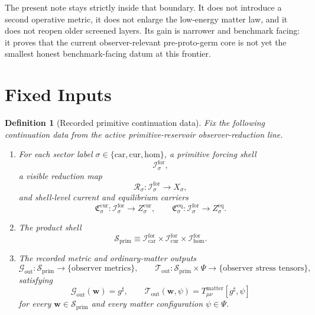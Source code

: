 \documentclass[11pt]{article}
\newcommand{\CompletedMetric}{g^{\sharp}}
\newcommand{\MatterSpace}{\Psi}
\newcommand{\Car}{\mathrm{car}}
\newcommand{\Cur}{\mathrm{cur}}
\newcommand{\Hom}{\mathrm{hom}}
\newcommand{\ForSpace}[1]{\mathcal I_{#1}^{\mathrm{for}}}
\newcommand{\PrimShell}{\mathcal S_{\mathrm{prim}}}
\newcommand{\Reduction}[1]{\mathcal R_{#1}}
\newcommand{\CurrentCarrier}[1]{\mathfrak C_{#1}^{\mathrm{cur}}}
\newcommand{\EqCarrier}[1]{\mathfrak C_{#1}^{\mathrm{eq}}}
\newcommand{\MetricOut}{\mathscr G_{\mathrm{out}}}
\newcommand{\MatterOut}{\mathscr T_{\mathrm{out}}}
\newtheorem{definition}{Definition}
\begin{document}
The present note stays strictly inside that boundary. It does not introduce a second operative metric, it does not enlarge the low-energy matter law, and it does not reopen older screened layers. Its gain is narrower and benchmark facing: it proves that the current observer-relevant pre-proto-germ core is not yet the smallest honest benchmark-facing datum at this frontier.

\section{Fixed Inputs}

\begin{definition}[Recorded primitive continuation data]
\label{def:fixed}
Fix the following continuation data from the active primitive-reservoir observer-reduction line.
\begin{enumerate}
    \item For each sector label \(\sigma\in\{\Car,\Cur,\Hom\}\), a primitive forcing shell
    \[
    \ForSpace{\sigma},
    \]
    a visible reduction map
    \[
    \Reduction{\sigma}:\ForSpace{\sigma}\to X_{\sigma},
    \]
    and shell-level current and equilibrium carriers
    \[
    \CurrentCarrier{\sigma}:\ForSpace{\sigma}\to Z_{\sigma}^{\mathrm{cur}},
    \qquad
    \EqCarrier{\sigma}:\ForSpace{\sigma}\to Z_{\sigma}^{\mathrm{eq}}.
    \]
    \item The product shell
    \[
    \PrimShell
    \equiv
    \ForSpace{\Car}\times \ForSpace{\Cur}\times \ForSpace{\Hom}.
    \]
    \item The recorded metric and ordinary-matter outputs
    \[
    \MetricOut:\PrimShell\to\{\text{observer metrics}\},
    \qquad
    \MatterOut:\PrimShell\times\MatterSpace\to\{\text{observer stress tensors}\},
    \]
    satisfying
    \begin{equation}
    \MetricOut(\mathbf w)=\CompletedMetric,
    \qquad
    \MatterOut(\mathbf w,\psi)
    =
    T_{\mu\nu}^{\mathrm{matter}}[\CompletedMetric,\psi]
    \label{eq:fixedoutputs}
    \end{equation}
    for every \(\mathbf w\in\PrimShell\) and every matter configuration \(\psi\in\MatterSpace\).
\end{enumerate}
\end{definition}
\end{document}
